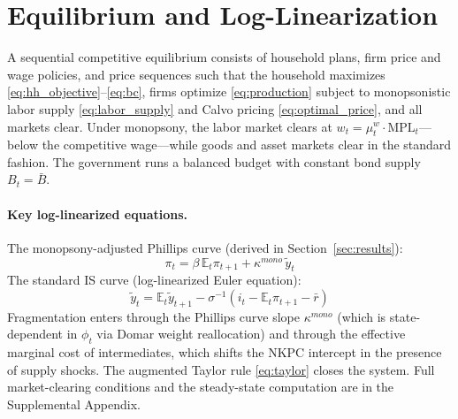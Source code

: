 \section{Equilibrium and Log-Linearization}
\label{sec:equilibrium}

A sequential competitive equilibrium consists of household plans,
firm price and wage policies, and price sequences such that the household
maximizes \eqref{eq:hh_objective}--\eqref{eq:bc}, firms optimize
\eqref{eq:production} subject to monopsonistic labor supply
\eqref{eq:labor_supply} and Calvo pricing \eqref{eq:optimal_price}, and
all markets clear. Under monopsony, the labor market clears at
$w_t = \mu_t^w \cdot \mathrm{MPL}_t$---below the competitive wage---while
goods and asset markets clear in the standard fashion. The government runs
a balanced budget with constant bond supply $B_t = \bar B$.

\paragraph{Key log-linearized equations.}
The monopsony-adjusted Phillips curve (derived in Section~\ref{sec:results}):
\begin{equation}
  \pi_t = \beta\,\mathbb{E}_t\pi_{t+1} + \kappa^{mono}\,\tilde{y}_t
  \label{eq:NKPC_linearized}
\end{equation}
The standard IS curve (log-linearized Euler equation):
\begin{equation}
  \tilde{y}_t = \mathbb{E}_t\tilde{y}_{t+1} -
  \sigma^{-1}(i_t - \mathbb{E}_t\pi_{t+1} - \bar r)
  \label{eq:IS_linearized}
\end{equation}
Fragmentation enters through the Phillips curve slope $\kappa^{mono}$
(which is state-dependent in $\phi_t$ via Domar weight reallocation) and
through the effective marginal cost of intermediates, which shifts the
NKPC intercept in the presence of supply shocks. The augmented Taylor rule
\eqref{eq:taylor} closes the system. Full market-clearing conditions and
the steady-state computation are in the Supplemental Appendix.
